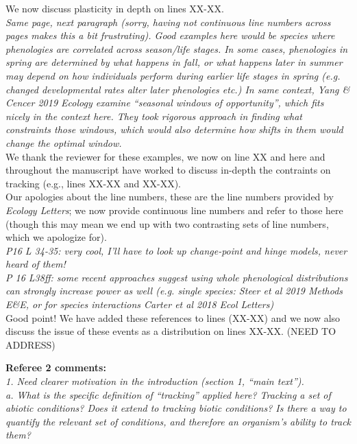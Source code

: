 \documentclass[11pt]{article}
\begin{document}
We now discuss plasticity in depth on lines XX-XX. \\

\emph{Same page, next paragraph (sorry, having not continuous line numbers across pages makes this a bit frustrating). Good examples here would be species where phenologies are correlated
across season/life stages. In some cases, phenologies in spring are determined by what
happens in fall, or what happens later in summer may depend on how individuals perform during
earlier life stages in spring (e.g. changed developmental rates alter later phenologies etc.)
In same context, Yang \& Cencer 2019 Ecology examine ``seasonal windows of opportunity'', which
fits nicely in the context here. They took rigorous approach in finding what constraints
those windows, which would also determine how shifts in them would change the optimal window.}\\

We thank the reviewer for these examples, we now \citet{yang2020} on line XX and here and throughout the manuscript have worked to discuss in-depth the contraints on tracking (e.g., lines XX-XX and XX-XX). \\

Our apologies about the line numbers, these are the line numbers provided by \emph{Ecology Letters}; we now provide continuous line numbers and refer to those here (though this may mean we end up with two contrasting sets of line numbers, which we apologize for).\\

\emph{P16 L 34-35: very cool, I’ll have to look up change-point and hinge models, never heard of
them!}\\

\emph{P 16 L38ff: some recent approaches suggest using whole phenological distributions can
strongly increase power as well (e.g. single species: Steer et al 2019 Methods E\&E, or for
species interactions Carter et al 2018 Ecol Letters)}\\

Good point! We have added these references to lines (XX-XX) and we now also discuss the issue of these events as a distribution on lines XX-XX. (NEED TO ADDRESS)


{\bf Referee 2 comments:} \\


\emph{1.      Need clearer motivation in the introduction (section 1, ``main text'').\\
a.      What is the specific definition of “tracking” applied here? Tracking a set of abiotic
conditions? Does it extend to tracking biotic conditions? Is there a way to quantify the
relevant set of conditions, and therefore an organism’s ability to track them?}\\
\end{document}
